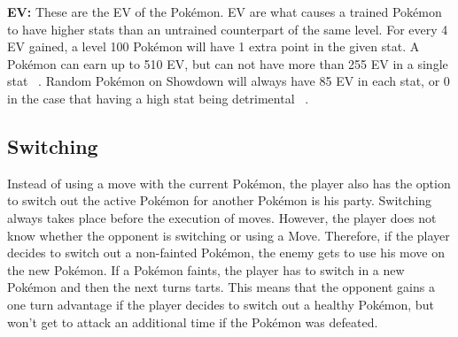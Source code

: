 \textbf{EV:} These are the \ac{EV} of the Pokémon. \ac{EV} are what causes a trained Pokémon to have higher
stats than an untrained counterpart of the same level. For every 4 \ac{EV} gained, a level 100 Pokémon 
will have 1 extra point in the given stat. A Pokémon can earn up to 510 \ac{EV}, but can not have more than
255 \ac{EV} in a single stat ~\autocite{Bulbapedia:Stat}. Random Pokémon on Showdown will always have 85 
\ac{EV} in each stat, or 0 in the case that having a high stat being detrimental ~\autocite{Smogon:RandBatsGuide}.

\subsection{Switching}
\label{sec:switching}
Instead of using a move with the current Pokémon, the player also has the option to switch out the 
active Pokémon for another Pokémon is his party. Switching always takes place before the execution of moves.
However, the player does not know whether the opponent is switching or using a Move. Therefore, if the 
player decides to switch out a non-fainted Pokémon, the enemy gets to use his move on the new Pokémon.
If a Pokémon faints, the player has to switch in a new Pokémon and then the next turns tarts. This means
that the opponent gains a one turn advantage if the player decides to switch out a healthy Pokémon, but
won't get to attack an additional time if the Pokémon was defeated.  

